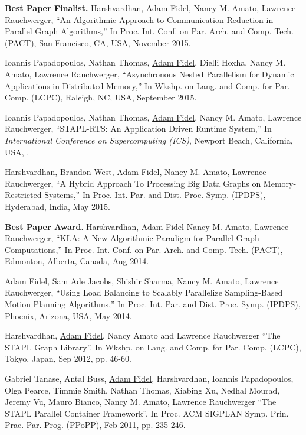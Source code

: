 \documentclass[a4paper,10pt,oneside]{article}
\begin{document}
\begin{body}
{{\bf Best Paper Finalist.} Harshvardhan, \underline{Adam Fidel}, Nancy M. Amato, Lawrence Rauchwerger, ``An Algorithmic Approach to Communication Reduction in Parallel Graph Algorithms,'' In Proc. Int. Conf. on Par. Arch. and Comp. Tech. (PACT), San Francisco, CA, USA, November 2015.}

\EntryGap

{Ioannis Papadopoulos, Nathan Thomas, \underline{Adam Fidel}, Dielli Hoxha, Nancy M. Amato, Lawrence Rauchwerger, ``Asynchronous Nested Parallelism for Dynamic Applications in Distributed Memory,'' In Wkshp. on Lang. and Comp. for Par. Comp. (LCPC), Raleigh, NC, USA, September 2015.}

\EntryGap

{Ioannis Papadopoulos, Nathan Thomas, \underline{Adam Fidel}, Nancy M. Amato, Lawrence Rauchwerger, ``STAPL-RTS: An Application Driven Runtime System,'' In \textit{International Conference on Supercomputing (ICS)}, Newport Beach, California, USA, .}

\EntryGap

{Harshvardhan, Brandon West, \underline{Adam Fidel}, Nancy M. Amato, Lawrence Rauchwerger, ``A Hybrid Approach To Processing Big Data Graphs on Memory-Restricted Systems,'' In Proc. Int. Par. and Dist. Proc. Symp. (IPDPS), Hyderabad, India, May 2015.}

\EntryGap

{{\bf Best Paper Award}. Harshvardhan, \underline{Adam Fidel} Nancy M. Amato, Lawrence Rauchwerger, ``KLA: A New Algorithmic Paradigm for Parallel Graph Computations,'' In Proc. Int. Conf. on Par. Arch. and Comp. Tech. (PACT), Edmonton, Alberta, Canada, Aug 2014.}

\EntryGap

{\underline{Adam Fidel}, Sam Ade Jacobs, Shishir Sharma, Nancy M. Amato, Lawrence Rauchwerger, ``Using Load Balancing to Scalably Parallelize Sampling-Based Motion Planning Algorithms,'' In Proc. Int. Par. and Dist. Proc. Symp. (IPDPS), Phoenix, Arizona, USA, May 2014.}

\EntryGap

{Harshvardhan, \underline{Adam Fidel}, Nancy Amato and Lawrence Rauchwerger ``The STAPL Graph Library''. In Wkshp. on Lang. and Comp. for Par. Comp. (LCPC), Tokyo, Japan, Sep 2012, pp. 46-60.}

\EntryGap

{Gabriel Tanase, Antal Buss, \underline{Adam Fidel}, Harshvardhan, Ioannis Papadopoulos, Olga Pearce, Timmie Smith, Nathan Thomas, Xiabing Xu, Nedhal Mourad, Jeremy Vu, Mauro Bianco, Nancy M. Amato, Lawrence Rauchwerger ``The STAPL Parallel Container Framework''. In Proc. ACM SIGPLAN Symp. Prin. Prac. Par. Prog. (PPoPP), Feb 2011, pp. 235-246.}


\end{body}
\end{document}
